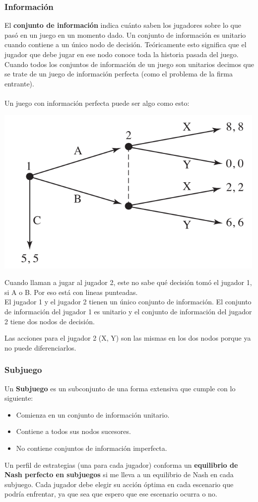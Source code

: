 \documentclass{article}
\begin{document}
            \subsubsection*{Información}
                El \textbf{conjunto de información} indica cuánto saben los jugadores sobre lo que pasó en un juego en un momento dado. Un conjunto de información es unitario cuando contiene a un único nodo de decisión. Teóricamente esto significa que el jugador que debe jugar en ese nodo conoce toda la historia pasada del juego. Cuando todos los conjuntos de información de un juego son unitarios decimos que se trate de un juego de información perfecta (como el problema de la firma entrante). \\
                \\
                Un juego con información perfecta puede ser algo como esto: \\
                \begin{center}
                    \includegraphics[width=0.5 \linewidth]{figs/informacion.png}
                \end{center}
                Cuando llaman a jugar al jugador 2, este no sabe qué decisión tomó el jugador 1, si A o B. Por eso está con lineas punteadas. \\
                El jugador 1 y el jugador 2 tienen un único conjunto de información. El conjunto de información del jugador 1 es unitario y el conjunto de información del jugador 2 tiene dos nodos de decisión.

                Las acciones para el jugador 2 (X, Y) son las mismas en los dos nodos porque ya no puede diferenciarlos.
            \subsubsection*{Subjuego}
                Un \textbf{Subjuego} es un subconjunto de una forma extensiva que cumple con lo siguiente:
                \begin{itemize}
                    \item Comienza en un conjunto de información unitario.
                    \item Contiene a todos sus nodos sucesores.
                    \item No contiene conjuntos de información imperfecta.
                \end{itemize}
                Un perfil de estrategias (una para cada jugador) conforma un \textbf{equilibrio de Nash perfecto en subjuegos} si me lleva a un equilibrio de Nash en cada subjuego. Cada jugador debe elegir su acción óptima en cada escenario que podría enfrentar, ya que sea que espero que ese escenario ocurra o no.
\end{document}

